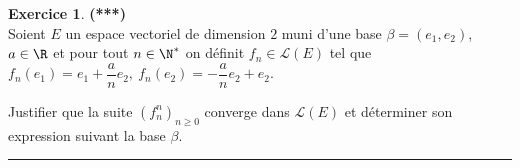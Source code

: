 \documentclass[a4paper,11pt]{article}
\theoremstyle{definition}
\newtheorem{exo}{Exercice} %
\begin{document}
\begin{exo}\textbf{(***)}\quad\\[0.25cm]%
	Soient $E$ un espace vectoriel de dimension $2$ muni d'une base $\beta = (e_1,e_2)$, $a\in\R$ et pour tout $n\in\N^*$ on définit $f_n\in \mathcal L (E)$ tel que  
	$f_n(e_1) = e_1 +\dfrac{a}{n}e_2, \ f_n(e_2) = -\dfrac{a}{n}e_2+e_2$.
	
	 Justifier que la suite $\left(f_n^n\right)_{n\geq0}$ converge dans $\mathcal L (E)$ et déterminer son expression suivant la base $\beta$. 
	
	
	\centering
	\rule{1\linewidth}{0.6pt}
\end{exo}
\end{document}
